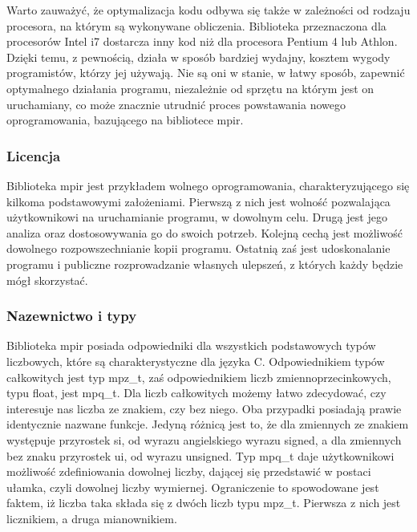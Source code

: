 \documentclass[twoside,a4paper]{book}
\begin{document}
Warto zauważyć, że optymalizacja kodu odbywa się także w zależności od rodzaju procesora, na którym są wykonywane obliczenia. Biblioteka przeznaczona dla procesorów Intel i7 dostarcza inny kod niż dla procesora Pentium 4 lub Athlon. Dzięki temu, z pewnością, działa w sposób bardziej wydajny, kosztem wygody programistów, którzy jej używają. Nie są oni w stanie, w łatwy sposób, zapewnić optymalnego działania programu, niezależnie od sprzętu na którym jest on uruchamiany, co może znacznie utrudnić proces powstawania nowego oprogramowania, bazującego na bibliotece mpir.

\subsubsection{Licencja}

Biblioteka mpir jest przykładem wolnego oprogramowania, charakteryzującego się kilkoma podstawowymi założeniami. Pierwszą z nich jest wolność pozwalająca użytkownikowi na uruchamianie programu, w dowolnym celu. Drugą jest jego analiza oraz dostosowywania go do swoich potrzeb. Kolejną cechą jest możliwość dowolnego rozpowszechnianie kopii programu. Ostatnią zaś jest udoskonalanie programu i publiczne rozprowadzanie własnych ulepszeń, z których każdy będzie mógł skorzystać.

\subsubsection{Nazewnictwo i typy}

Biblioteka mpir posiada odpowiedniki dla wszystkich podstawowych typów liczbowych, które są charakterystyczne dla języka C. Odpowiednikiem typów całkowitych jest typ mpz\_t, zaś odpowiednikiem liczb zmiennoprzecinkowych, typu float, jest mpq\_t. Dla liczb całkowitych możemy łatwo zdecydować, czy interesuje nas liczba ze znakiem, czy bez niego. Oba przypadki posiadają prawie identycznie nazwane funkcje. Jedyną różnicą jest to, że dla zmiennych ze znakiem występuje przyrostek si, od wyrazu angielskiego wyrazu signed, a dla zmiennych bez znaku przyrostek ui, od wyrazu unsigned. Typ mpq\_t daje użytkownikowi możliwość zdefiniowania dowolnej liczby, dającej się przedstawić w postaci ułamka, czyli dowolnej liczby wymiernej. Ograniczenie to spowodowane jest faktem, iż liczba taka składa się z dwóch liczb typu mpz\_t. Pierwsza z nich jest licznikiem, a druga mianownikiem.
\end{document}
